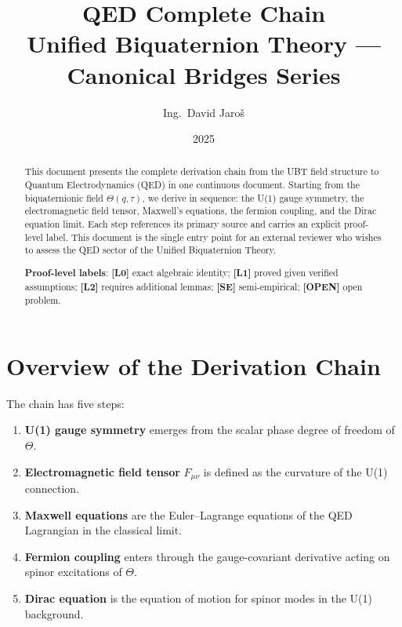 \documentclass[11pt,a4paper]{article}
\title{QED Complete Chain\\
\large Unified Biquaternion Theory — Canonical Bridges Series}
\author{Ing.\ David Jaroš}
\date{2025}
\newcommand{\Lzero}{\textbf{[L0]}}
\newcommand{\Lone}{\textbf{[L1]}}
\newcommand{\Ltwo}{\textbf{[L2]}}
\newcommand{\SE}{\textbf{[SE]}}
\newcommand{\OPEN}{\textbf{[OPEN]}}
\begin{document}
\maketitle

\begin{abstract}
This document presents the complete derivation chain from the UBT field structure
to Quantum Electrodynamics (QED) in one continuous document.
Starting from the biquaternionic field $\Theta(q,\tau)$, we derive in sequence:
the U(1) gauge symmetry, the electromagnetic field tensor, Maxwell's equations,
the fermion coupling, and the Dirac equation limit.
Each step references its primary source and carries an explicit proof-level label.
This document is the single entry point for an external reviewer who wishes to
assess the QED sector of the Unified Biquaternion Theory.

\medskip
\noindent\textbf{Proof-level labels}: \Lzero{} exact algebraic identity;
\Lone{} proved given verified assumptions; \Ltwo{} requires additional lemmas;
\SE{} semi-empirical; \OPEN{} open problem.
\end{abstract}

\tableofcontents
\newpage

\section{Overview of the Derivation Chain}

The chain has five steps:

\begin{enumerate}
  \item \textbf{U(1) gauge symmetry} emerges from the scalar phase degree of
        freedom of $\Theta$.
  \item \textbf{Electromagnetic field tensor} $F_{\mu\nu}$ is defined as the
        curvature of the U(1) connection.
  \item \textbf{Maxwell equations} are the Euler--Lagrange equations of the
        QED Lagrangian in the classical limit.
  \item \textbf{Fermion coupling} enters through the gauge-covariant derivative
        acting on spinor excitations of $\Theta$.
  \item \textbf{Dirac equation} is the equation of motion for spinor modes in
        the U(1) background.
\end{enumerate}
\end{document}
